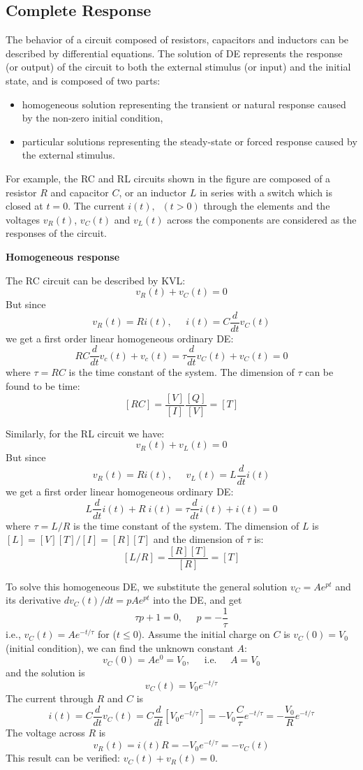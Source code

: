 \subsection*{Complete Response}

The behavior of a circuit composed of resistors, capacitors and inductors can
be described by differential equations. The solution of DE represents the 
response (or output) of the circuit to both the external stimulus (or input) 
and the initial state, and is composed of two parts:
\begin{itemize}
\item homogeneous solution representing the transient or natural response 
	caused by the non-zero initial condition,
\item particular solutions representing the steady-state or forced response 
	caused by the external stimulus. 
\end{itemize} 

For example, the RC and RL circuits shown in the figure are composed of a 
resistor $R$ and capacitor $C$, or an inductor $L$ in series with a switch
which is closed at $t=0$. The current $i(t),\;\;(t>0)$ through the elements
and the voltages $v_R(t)$, $v_C(t)$ and $v_L(t)$ across the components are
considered as the responses of the circuit.


{\bf Homogeneous response}

The RC circuit can be described by KVL:
\[	v_R(t)+v_C(t)=0	\]
But since 
\[	v_R(t)=R i(t),\;\;\;\;\;i(t)=C\frac{d}{dt}v_C(t)	\]
we get a first order linear homogeneous ordinary DE:
\[	RC\frac{d}{dt} v_c(t)+v_c(t)=\tau \frac{d}{dt} v_C(t)+v_C(t)=0	\]
where $\tau=RC$ is the time constant of the system. The dimension of $\tau$ 
can be found to be time:
\[	[RC]=\frac{[V]}{[I]}\frac{[Q]}{[V]}=[T]	\]

Similarly, for the RL circuit we have:
\[	v_R(t)+v_L(t)=0	\]
But since 
\[	v_R(t)=R i(t),\;\;\;\;\;v_L(t)=L\frac{d}{dt}i(t)	\]
we get a first order linear homogeneous ordinary DE:
\[	L\frac{d}{dt} i(t)+R\;i(t)=\tau \frac{d}{dt} i(t)+i(t)=0	\]
where $\tau=L/R$ is the time constant of the system. The dimension of 
$L$ is $[L]=[V][T]/[I]=[R][T]$ and the dimension of $\tau$ is: 
\[	[L/R]=\frac{[R][T]}{[R]}=[T]	\]

To solve this homogeneous DE, we substitute the general solution 
$v_C=A e^{pt}$ and its derivative $dv_C(t)/dt=p A e^{pt}$ into the DE,
and get
\[	\tau p+1=0,\;\;\;\;\;p=-\frac{1}{\tau}	\]
i.e., $v_C(t)=Ae^{-t/\tau}$ for ($t\le 0$). Assume the initial charge on $C$
is $v_C(0)=V_0$ (initial condition), we can find the unknown constant $A$:
\[	v_C(0)=A e^{0}=V_0,\;\;\;\;\;\mbox{i.e.}\;\;\;\;\;A=V_0	\]
and the solution is 
\[	v_C(t)=V_0 e^{-t/\tau}		\]
The current through $R$ and $C$ is
\[	i(t)=C\frac{d}{dt}v_C(t)=C\frac{d}{dt}[V_0 e^{-t/\tau}]
	=-V_0 \frac{C}{\tau} e^{-t/\tau}=-\frac{V_0}{R} e^{-t/\tau}	\]
The voltage across $R$ is 
\[	v_R(t)=i(t)R=-V_0 e^{-t/\tau}=-v_C(t)	\]
This result can be verified: $v_C(t)+v_R(t)=0$.

